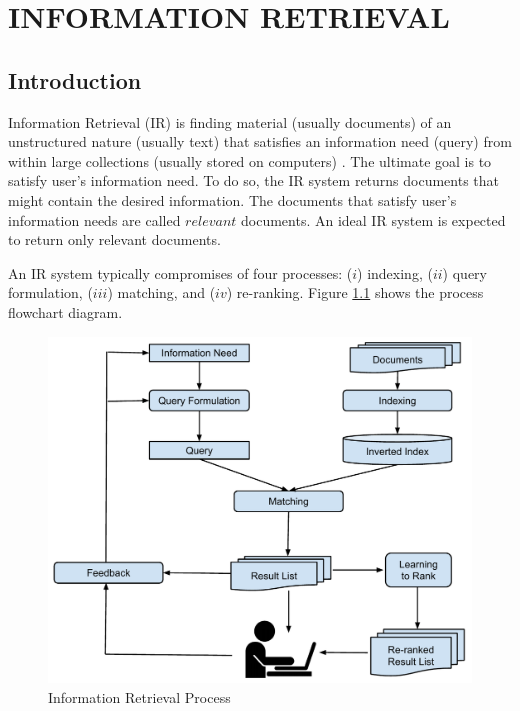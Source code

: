 %
%
%




\chapter{\textbf{INFORMATION RETRIEVAL}}
\label{ch2}

\section{Introduction}

Information Retrieval (IR) is finding material (usually documents) of an unstructured nature (usually text) that satisfies an information need (query) from within large collections (usually stored on computers) \citep{irbook}.
The ultimate goal is to satisfy user's information need. 
To do so, the IR system returns documents that might contain the desired information.
The documents that satisfy user's information needs are called $relevant$ documents.
An ideal IR system is expected to return only relevant documents.

An IR system typically compromises of four processes: ($i$) indexing, ($ii$) query formulation, ($iii$) matching, and ($iv$) re-ranking.
Figure \ref{fig:irprocess} shows the process flowchart diagram.

\begin{figure}[!b]
\centering
\includegraphics[width=0.80\hsize]{IRProcess.pdf}
\caption{Information Retrieval Process}
\label{fig:irprocess}
\end{figure}

